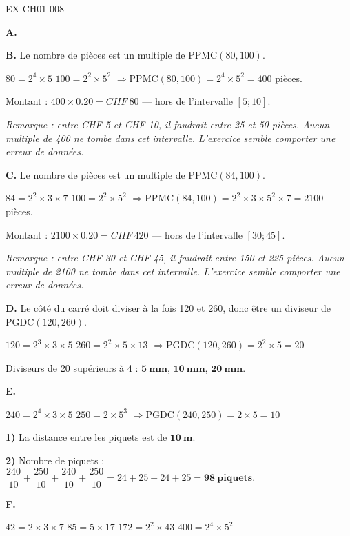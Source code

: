 \documentclass[12pt, a4paper]{article}
\begin{document}
\begin{solution}{EX-CH01-008}

\textbf{A.} 

\bigskip
\textbf{B.} Le nombre de pièces est un multiple de $\text{PPMC}(80, 100)$.

$80 = 2^4 \times 5$ \quad $100 = 2^2 \times 5^2$ \quad $\Rightarrow \text{PPMC}(80,100) = 2^4 \times 5^2 = 400$ pièces.

Montant : $400 \times 0.20 = CHF\ 80$ — hors de l'intervalle $[5; 10]$.

\medskip
\textit{Remarque : entre CHF 5 et CHF 10, il faudrait entre 25 et 50 pièces. Aucun multiple de 400 ne tombe dans cet intervalle. L'exercice semble comporter une erreur de données.}

\bigskip
\textbf{C.} Le nombre de pièces est un multiple de $\text{PPMC}(84, 100)$.

$84 = 2^2 \times 3 \times 7$ \quad $100 = 2^2 \times 5^2$ \quad $\Rightarrow \text{PPMC}(84,100) = 2^2 \times 3 \times 5^2 \times 7 = 2100$ pièces.

Montant : $2100 \times 0.20 = CHF\ 420$ — hors de l'intervalle $[30; 45]$.

\medskip
\textit{Remarque : entre CHF 30 et CHF 45, il faudrait entre 150 et 225 pièces. Aucun multiple de 2100 ne tombe dans cet intervalle. L'exercice semble comporter une erreur de données.}

\bigskip
\textbf{D.} Le côté du carré doit diviser à la fois 120 et 260, donc être un diviseur de $\text{PGDC}(120, 260)$.

$120 = 2^3 \times 3 \times 5$ \quad $260 = 2^2 \times 5 \times 13$ \quad $\Rightarrow \text{PGDC}(120,260) = 2^2 \times 5 = 20$

Diviseurs de 20 supérieurs à 4 : $\mathbf{5\ mm}$, $\mathbf{10\ mm}$, $\mathbf{20\ mm}$.

\bigskip
\textbf{E.}

$240 = 2^4 \times 3 \times 5$ \quad $250 = 2 \times 5^3$ \quad $\Rightarrow \text{PGDC}(240,250) = 2 \times 5 = 10$

\textbf{1)} La distance entre les piquets est de $\mathbf{10\ m}$.

\textbf{2)} Nombre de piquets : $\dfrac{240}{10} + \dfrac{250}{10} + \dfrac{240}{10} + \dfrac{250}{10} = 24 + 25 + 24 + 25 = \mathbf{98\ piquets}$.

\bigskip
\textbf{F.}

$42 = 2 \times 3 \times 7$ \quad $85 = 5 \times 17$ \quad $172 = 2^2 \times 43$ \quad $400 = 2^4 \times 5^2$


\end{solution}
\end{document}
